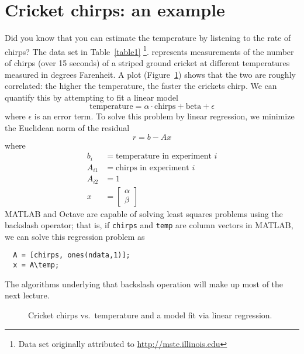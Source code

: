 \documentclass[12pt, leqno]{article} %
\begin{document}

\section{Cricket chirps: an example}

Did you know that you can estimate the temperature by listening to the
rate of chirps?  The data set in Table~\ref{table1}%
\footnote{Data set originally attributed to
  \url{http://mste.illinois.edu}}.  represents measurements of the
number of chirps (over 15 seconds) of a striped ground cricket at
different temperatures measured in degrees Farenheit.  A plot
(Figure~\ref{fig2}) shows that the two are roughly correlated: the
higher the temperature, the faster the crickets chirp.  We can
quantify this by attempting to fit a linear model
\[
  \mbox{temperature} = \alpha \cdot \mbox{chirps} + \mbox{beta} + \epsilon
\]
where $\epsilon$ is an error term.  To solve this problem by linear
regression, we minimize the Euclidean norm of the residual
\[
  r = b-Ax
\]
where
\begin{align*}
  b_{i} &= \mbox{temperature in experiment } i \\
  A_{i1} &= \mbox{chirps in experiment } i \\
  A_{i2} &= 1 \\
  x &= \begin{bmatrix} \alpha \\ \beta \end{bmatrix}
\end{align*}
MATLAB and Octave are capable of solving least squares problems using
the backslash operator; that is, if {\tt chirps} and {\tt temp} are
column vectors in MATLAB, we can solve this regression problem as
\begin{lstlisting}
  A = [chirps, ones(ndata,1)];
  x = A\temp;
\end{lstlisting}
The algorithms underlying that backslash operation will make up
most of the next lecture.

\begin{figure}
  \begin{center}
  \end{center}
  \caption{Cricket chirps vs.~temperature and a model fit via
    linear regression.}
  \label{fig2}
\end{figure}
\end{document}
